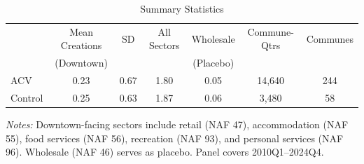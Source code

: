 \begin{table}[ht]
\centering
\caption{Summary Statistics}
\label{tab:summary}
\begin{tabular}{lcccccc}
\toprule
 & \multicolumn{1}{c}{Mean Creations} & \multicolumn{1}{c}{SD} & \multicolumn{1}{c}{All Sectors} & \multicolumn{1}{c}{Wholesale} & \multicolumn{1}{c}{Commune-Qtrs} & \multicolumn{1}{c}{Communes} \\
 & (Downtown) & & & (Placebo) & & \\
\midrule
ACV & 0.23 & 0.67 & 1.80 & 0.05 & 14,640 & 244 \\
Control & 0.25 & 0.63 & 1.87 & 0.06 & 3,480 & 58 \\
\bottomrule
\end{tabular}
\begin{tablenotes}\small
\item \textit{Notes:} Downtown-facing sectors include retail (NAF 47), accommodation (NAF 55), food services (NAF 56), recreation (NAF 93), and personal services (NAF 96). Wholesale (NAF 46) serves as placebo. Panel covers 2010Q1--2024Q4.
\end{tablenotes}
\end{table}
